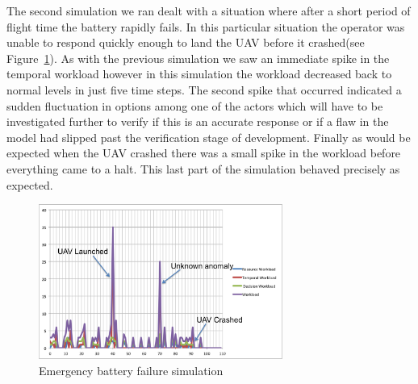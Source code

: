 The second simulation we ran dealt with a situation where after a short period of flight time the battery rapidly fails. In this particular situation the operator was unable to respond quickly enough to land the UAV before it crashed(see Figure~\ref{fig:WorkloadSim2}). As with the previous simulation we saw an immediate spike in the temporal workload however in this simulation the workload decreased back to normal levels in just five time steps. The second spike that occurred indicated a sudden fluctuation in options among one of the actors which will have to be investigated further to verify if this is an accurate response or if a flaw in the model had slipped past the verification stage of development. Finally as would be expected when the UAV crashed there was a small spike in the workload before everything came to a halt. This last part of the simulation behaved precisely as expected.

\begin{figure}[h]
\center
\setlength{\abovecaptionskip}{1mm}
\setlength{\belowcaptionskip}{1mm}
\setlength{\textfloatsep}{1mm}
\setlength{\floatsep}{1mm}
\includegraphics[height=2in]{WorkloadCrashedLabeled.png}
\caption{Emergency battery failure simulation}
\label{fig:WorkloadSim2}
\end{figure}